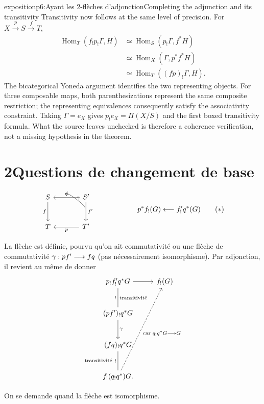 \begin{dcomment}{exposition}{p6:Ayant les 2-flèches d'adjonction}{Completing the adjunction and its transitivity}
Transitivity now follows at the same level of precision. For $X\xrightarrow{p}S\xrightarrow{f}T$,
\[
\begin{aligned}
 \operatorname{Hom}_T(f_!p_!\Gamma,H)
 &\simeq\operatorname{Hom}_S(p_!\Gamma,f^*H)\\
 &\simeq\operatorname{Hom}_X(\Gamma,p^*f^*H)\\
 &\simeq\operatorname{Hom}_T((fp)_!\Gamma,H).
\end{aligned}
\]
The bicategorical Yoneda argument identifies the two representing objects. For three composable maps, both parenthesizations represent the same composite restriction; the representing equivalences consequently satisfy the associativity constraint. Taking $\Gamma=e_X$ gives $p_!e_X=\Pi(X/S)$ and the first boxed transitivity formula. What the source leaves unchecked is therefore a coherence verification, not a missing hypothesis in the theorem.
\end{dcomment}



\section*{2\quad Questions de changement de base}

\[
\begin{tikzcd}[column sep=large, row sep=large]
S & S' \arrow[l, "q"'] \arrow[d, "f'"] \\
T \arrow[from=1-1, "f"'] & T' \arrow[l, "p"]
\arrow[from=2-2, to=1-1, bend right=50, shorten <=18pt, shorten >=18pt, "\gamma"']
\end{tikzcd}
\qquad\qquad\qquad
p^*f_!(G) \longleftarrow f'_!q^*(G)
\tag*{$(*)$}
\]

La flèche est définie, pourvu qu'on ait commutativité ou une flèche de commutativité $\gamma : pf' \longrightarrow fq$ (pas nécessairement isomorphisme). Par adjonction, il revient au même de donner
\[
\begin{tikzcd}[row sep=large]
p_!f'_!q^*G \arrow[r] \arrow[d, dash, "\wr"', "\text{transitivité}"] & f_!(G) \\
(pf')_!q^*G \arrow[d, "\gamma"] & \\
(fq)_!q^*G \arrow[d, dash, "\text{transitivité}\ \wr"'] & \\
f_!(q_!q^*)G. \arrow[uuur, dashed, "\text{car } q_!q^*G \longrightarrow G"'] &
\end{tikzcd}
\]

On se demande quand la flèche est isomorphisme.


